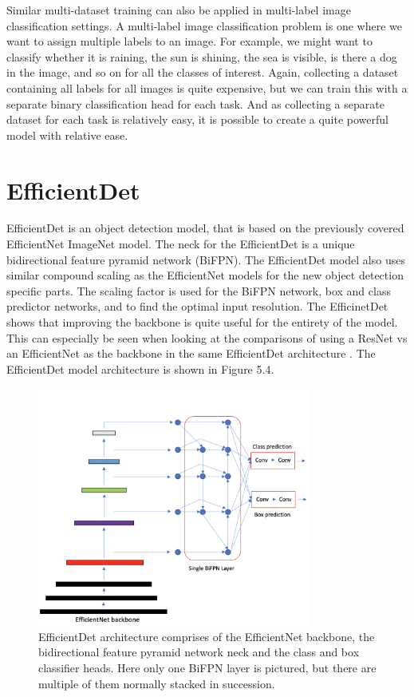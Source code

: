 Similar multi-dataset training can also be applied in multi-label image classification settings.
A multi-label image classification problem is one where we want to assign multiple labels to an image.
For example, we might want to classify whether it is raining, the sun is shining, the sea is visible, is there a dog in the image, and so on for all the classes of interest.
Again, collecting a dataset containing all labels for all images is quite expensive, but we can train this with a separate binary classification head for each task.
And as collecting a separate dataset for each task is relatively easy, it is possible to create a quite powerful model with relative ease.

\section{EfficientDet}
EfficientDet \citep{efficientDet} is an object detection model, that is based on the previously covered EfficientNet ImageNet model.
The neck for the EfficientDet is a unique bidirectional feature pyramid network (BiFPN).
The EfficientDet model also uses similar compound scaling as the EfficientNet models for the new object detection specific parts.
The scaling factor is used for the BiFPN network, box and class predictor networks, and to find the optimal input resolution.
The EfficinetDet shows that improving the backbone is quite useful for the entirety of the model.
This can especially be seen when looking at the comparisons of using a ResNet vs an EfficientNet as the backbone in the same EfficientDet architecture \citep{efficientDet}.
The EfficientDet model architecture is shown in Figure 5.4.

\begin{figure}[h!]
    \centering
    \includegraphics[width=0.8\textwidth]{imgs/eDet-own.png}
    \caption{EfficientDet architecture comprises of the EfficientNet \citep{efficientNet} backbone, the bidirectional feature pyramid network neck and the class and box classifier heads. Here only one BiFPN layer is pictured, but there are multiple of them normally stacked in succession.}
\end{figure}

